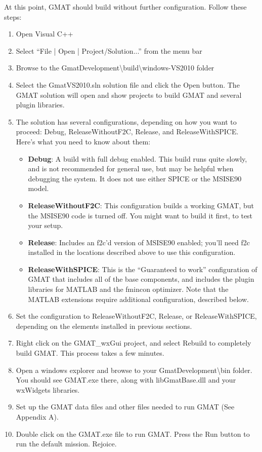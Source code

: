 \documentclass[letterpaper,10pt]{article}%
\begin{document}
At this point, GMAT should build without further configuration.  Follow these steps:
\begin{enumerate}
\item Open Visual C++
\item Select ``File | Open | Project/Solution...'' from the menu bar
\item Browse to the GmatDevelopment\textbackslash build\textbackslash windows-VS2010 folder
\item Select the GmatVS2010.sln solution file and click the Open button.  The GMAT solution will open and show projects to build GMAT and several plugin libraries.
\item The solution has several configurations, depending on how you want to proceed: Debug, ReleaseWithoutF2C, Release, and ReleaseWithSPICE.  Here's what you need to know about them:
\begin{itemize}
\item \textbf{Debug}:  A build with full debug enabled.  This build runs quite slowly, and is not recommended for general use, but may be helpful when debugging the system.  It does not use either SPICE or the MSISE90 model.
\item \textbf{ReleaseWithoutF2C}: This configuration builds a working GMAT, but the MSISE90 code is turned off.  You might want to build it first, to test your setup.
\item \textbf{Release}: Includes an f2c'd version of MSISE90 enabled; you'll need f2c installed in the locations described above to use this configuration.
\item \textbf{ReleaseWithSPICE}: This is the ``Guaranteed to work'' configuration of GMAT that includes all of the base components, and includes the plugin libraries for MATLAB and the fmincon optimizer.  Note that the MATLAB extensions require additional configuration, described below.
\end{itemize}
\item Set the configuration to ReleaseWithoutF2C, Release, or ReleaseWithSPICE, depending on the elements installed in previous sections.
\item Right click on the GMAT\_wxGui project, and select Rebuild to completely build GMAT.  This process takes a few minutes.
\item Open a windows explorer and browse to your GmatDevelopment\textbackslash bin folder.  You should see GMAT.exe there, along with libGmatBase.dll and your wxWidgets libraries.
\item Set up the GMAT data files and other files needed to run GMAT (See Appendix A).
\item Double click on the GMAT.exe file to run GMAT.  Press the Run button to run the default mission.  Rejoice.
\end{enumerate}
\end{document}
